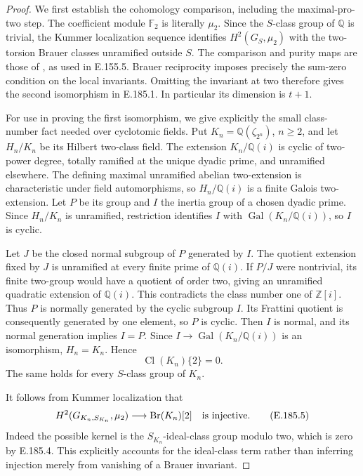 \begin{proof}
We first establish the cohomology comparison, including the
maximal-pro-two step. The coefficient module \(\mathbb F_2\)
is literally \(\mu_2\). Since the \(S\)-class group of
\(\mathbb Q\) is trivial, the Kummer localization sequence
identifies \(H^2(G_S,\mu_2)\) with the two-torsion Brauer
classes unramified outside \(S\). The comparison and purity
maps are those of
\citet[II.1.7(b), pp.~151--152; II.2.9, pp.~170--171]{CohMilneADT},
as used in E.155.5. Brauer reciprocity
\citep[II.2.1--2.2, pp.~163--165]{CohMilneADT}
imposes precisely the sum-zero condition on the local invariants.
Omitting the invariant at two therefore gives the second
isomorphism in E.185.1. In particular its dimension is \(t+1\).

For use in proving the first isomorphism, we give explicitly
the small class-number fact needed over cyclotomic fields.
Put \(K_n=\mathbb Q(\zeta_{2^n})\), \(n\geq2\), and let
\(H_n/K_n\) be its Hilbert two-class field. The extension
\(K_n/\mathbb Q(i)\) is cyclic of two-power degree, totally
ramified at the unique dyadic prime, and unramified elsewhere.
The defining maximal unramified abelian two-extension is
characteristic under field automorphisms, so \(H_n/\mathbb Q(i)\)
is a finite Galois two-extension. Let \(P\) be its group and
\(I\) the inertia group of a chosen dyadic prime. Since
\(H_n/K_n\) is unramified, restriction identifies \(I\) with
\(\operatorname{Gal}(K_n/\mathbb Q(i))\), so \(I\) is cyclic.

Let \(J\) be the closed normal subgroup of \(P\) generated
by \(I\). The quotient extension fixed by \(J\) is unramified
at every finite prime of \(\mathbb Q(i)\). If \(P/J\) were
nontrivial, its finite two-group would have a quotient of order
two, giving an unramified quadratic extension of
\(\mathbb Q(i)\). This contradicts the class number one of
\(\mathbb Z[i]\). Thus \(P\) is normally generated by the
cyclic subgroup \(I\). Its Frattini quotient is consequently
generated by one element, so \(P\) is cyclic. Then \(I\) is
normal, and its normal generation implies \(I=P\). Since
\(I\to\operatorname{Gal}(K_n/\mathbb Q(i))\) is an
isomorphism, \(H_n=K_n\). Hence
\[
                    \operatorname{Cl}(K_n)\{2\}=0.
 \tag{E.185.4}
\]
The same holds for every \(S\)-class group of \(K_n\).

It follows from Kummer localization that
\[
       H^2(G_{K_n,S_{K_n}},\mu_2)
                \longrightarrow \operatorname{Br}(K_n)[2]
       \quad\hbox{is injective}.
 \tag{E.185.5}
\]
Indeed the possible kernel is the \(S_{K_n}\)-ideal-class
group modulo two, which is zero by E.185.4. This explicitly
accounts for the ideal-class term rather than inferring
injection merely from vanishing of a Brauer invariant.


\end{proof}
